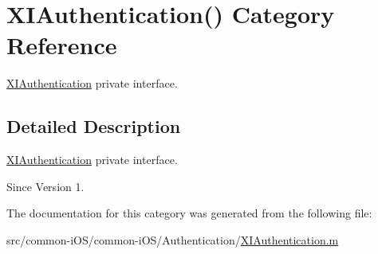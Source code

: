\hypertarget{category_x_i_authentication_07_08}{}\section{X\+I\+Authentication() Category Reference}
\label{category_x_i_authentication_07_08}


\hyperlink{class_x_i_authentication}{X\+I\+Authentication} private interface.  




\subsection{Detailed Description}
\hyperlink{class_x_i_authentication}{X\+I\+Authentication} private interface. 

\begin{DoxySince}{Since}
Version 1. 
\end{DoxySince}


The documentation for this category was generated from the following file\+:\begin{DoxyCompactItemize}
\item 
src/common-\/i\+O\+S/common-\/i\+O\+S/\+Authentication/\hyperlink{_x_i_authentication_8m}{X\+I\+Authentication.\+m}\end{DoxyCompactItemize}
